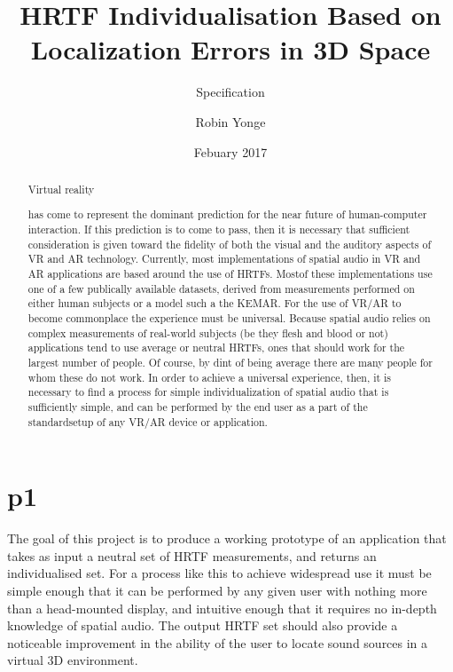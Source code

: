 \documentclass[10pt, oneside, a4paper, draft]{scrartcl}
\begin{document}

\title{HRTF Individualisation Based on Localization Errors in 3D Space}
\subtitle{Specification}
\author{Robin Yonge}
\date{Febuary 2017}
\maketitle

\renewcommand{\abtractname}{Introduction} %
\begin {abstract}
Virtual reality has come to represent the dominant prediction for the near future of human-computer interaction. If this prediction is to come to pass, then it is necessary that sufficient consideration is given toward the fidelity of both the visual and the auditory aspects of VR and AR technology. Currently, most implementations of spatial audio in VR and AR applications are based around the use of HRTFs. Mostof these implementations use one of a few publically available datasets, derived from measurements performed on either human subjects or a model such a the KEMAR\cite{Algazi2001}\cite{Gardner1994}. For the use of VR/AR to become commonplace the experience must be universal. Because spatial audio relies on complex measurements of real-world subjects (be they flesh and blood or not) applications tend to use average or neutral HRTFs, ones that should work for the largest number of people. Of course, by dint of being average there are many people for whom these do not work. In order to achieve a universal experience, then, it is necessary to find a process for  simple individualization of spatial audio that is sufficiently simple, and can be performed by the end user as a part of the standardsetup of any VR/AR device or application.
\end {abstract}

\section*{p1}
The goal of this project is to produce a working prototype of an application that takes as input a neutral set of HRTF measurements, and returns an individualised set. For a process like this to achieve widespread use it must be simple enough that it can be performed by any given user with nothing more than a head-mounted display, and intuitive enough that it requires no in-depth knowledge of spatial audio. The output HRTF set should also provide a noticeable improvement in the ability of the user to locate sound sources in a virtual 3D environment.
\end{document}

